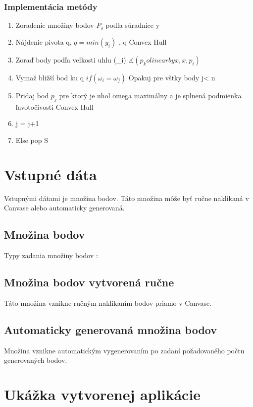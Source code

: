\documentclass[12pt]{article}
\begin{document}
\subsubsection{Implementácia metódy}
\begin{enumerate}
	\item Zoradenie množiny bodov $P_s$ podľa súradnice y 
	\item Nájdenie pivota q, $ q = min(y_i)$ , q \to Convex Hull
	\item Zoraď body podľa veľkosti uhlu  (\omega_i) $ \measuredangle(p_kolinear by x, x, p_i)$
	\item Vymaž bližší bod ku q $ if(\omega_i = \omega_j) $
	\itme Opakuj pre vštky body j< n 
	\item Pridaj bod $p_j$ pre ktorý je uhol omega maximálny a je splnená podmienka ľavotočivosti  \to Convex Hull
	\item \hspace {1.5cm} j = j+1
	\item Else pop S
	
\end{enumerate}


\section{Vstupné dáta}
Vstupnými dátami je množina bodov. Táto množina môže byť ručne naklikaná v Canvase alebo automaticky generovaná.
\subsection{Množina bodov}
Typy zadania množiny bodov : 

\subsection{Množina bodov vytvorená ručne}
Táto množina vznikne ručným naklikaním bodov priamo v Canvase.

\subsection{Automaticky generovaná množina bodov}
Množina vznikne automatickým vygenerovaním po zadaní požadovaného počtu generovaných bodov.

\section{Ukážka vytvorenej aplikácie}
\end{document}
